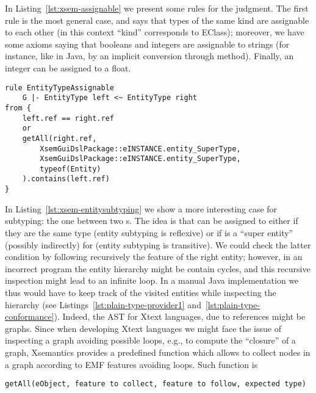 In Listing~\ref{lst:xsem-assignable} we present some rules for the
 judgment.  The first rule is the most general case, and says
that types of the same kind are assignable to each other (in this context
``kind'' corresponds to EClass); moreover, we have some axioms saying that
booleans and integers are assignable to strings (for instance, like in Java, by
an implicit conversion through  method).  Finally, an integer can
be assigned to a float.

\begin{lstlisting}[language=xsemantics,float,label=lst:xsem-entitysubtyping,caption=Rule
for \mytt{isAssignable} for entity types.] 
rule EntityTypeAssignable
	G |- EntityType left <~ EntityType right
from {
	left.ref == right.ref
	or
	getAll(right.ref, 
		XsemGuiDslPackage::eINSTANCE.entity_SuperType,
		XsemGuiDslPackage::eINSTANCE.entity_SuperType,
		typeof(Entity)
	).contains(left.ref)
}
\end{lstlisting}

In Listing~\ref{lst:xsem-entitysubtyping} we show a more interesting case for
subtyping: the one between two s.  The idea is that
 can be assigned to  either if they are the same type (entity
subtyping is reflexive) or if  is a ``super entity'' (possibly
indirectly) for  (entity subtyping is transitive).  We could check
the latter condition by following recursively the feature  of
the right entity; however, in an incorrect program the entity hierarchy might be
contain cycles, and this recursive inspection might lead to an infinite loop. 
In a manual Java implementation we thus would have to keep track of the visited
entities while inspecting the hierarchy (see
Listings~\ref{lst:plain-type-provider1} and~\ref{lst:plain-type-conformance}). 
Indeed, the AST for Xtext languages, due to references might be graphs.  Since when developing Xtext languages we
might face the issue of inspecting a graph avoiding possible loops, e.g., to
compute the ``closure'' of a graph, Xsemantics provides a predefined function
which allows to collect nodes in a graph according to EMF features avoiding
loops.  Such function is

\begin{small}
\begin{verbatim}
getAll(eObject, feature to collect, feature to follow, expected type)
\end{verbatim}
\end{small}


